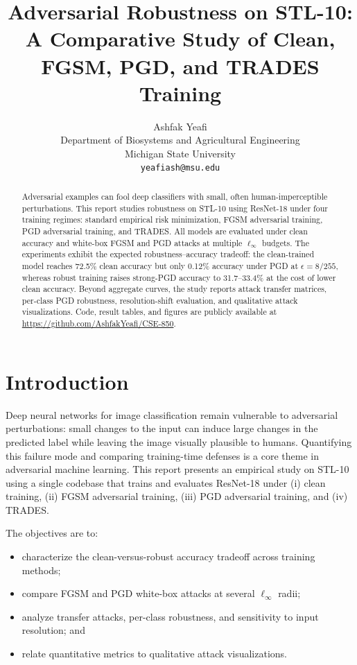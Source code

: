 \documentclass{article}
\title{Adversarial Robustness on STL-10: A Comparative Study of Clean, FGSM, PGD, and TRADES Training}
\author{%
  Ashfak Yeafi \\
  Department of Biosystems and Agricultural Engineering \\
  Michigan State University \\
  \texttt{yeafiash@msu.edu}%
}
\begin{document}
\maketitle

\begin{abstract}
Adversarial examples can fool deep classifiers with small, often human-imperceptible perturbations. This report studies robustness on STL-10 using ResNet-18 under four training regimes: standard empirical risk minimization, FGSM adversarial training, PGD adversarial training, and TRADES. All models are evaluated under clean accuracy and white-box FGSM and PGD attacks at multiple $\ell_\infty$ budgets. The experiments exhibit the expected robustness--accuracy tradeoff: the clean-trained model reaches 72.5\% clean accuracy but only 0.12\% accuracy under PGD at $\epsilon=8/255$, whereas robust training raises strong-PGD accuracy to 31.7--33.4\% at the cost of lower clean accuracy. Beyond aggregate curves, the study reports attack transfer matrices, per-class PGD robustness, resolution-shift evaluation, and qualitative attack visualizations. Code, result tables, and figures are publicly available at \url{https://github.com/AshfakYeafi/CSE-850}.
\end{abstract}

\section{Introduction}
Deep neural networks for image classification remain vulnerable to adversarial perturbations: small changes to the input can induce large changes in the predicted label while leaving the image visually plausible to humans. Quantifying this failure mode and comparing training-time defenses is a core theme in adversarial machine learning. This report presents an empirical study on STL-10 using a single codebase that trains and evaluates ResNet-18 under (i) clean training, (ii) FGSM adversarial training, (iii) PGD adversarial training, and (iv) TRADES.

The objectives are to:
\begin{itemize}
\item characterize the clean-versus-robust accuracy tradeoff across training methods;
\item compare FGSM and PGD white-box attacks at several $\ell_\infty$ radii;
\item analyze transfer attacks, per-class robustness, and sensitivity to input resolution; and
\item relate quantitative metrics to qualitative attack visualizations.
\end{itemize}
\end{document}
